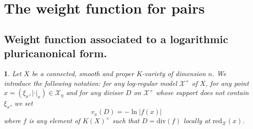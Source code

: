 \documentclass{amsart}%
\numberwithin{equation}{subsection}
\theoremstyle{plain2}
\theoremstyle{definition2}
\theoremstyle{stepstyle}
\theoremstyle{point}
\theoremstyle{subpoint}
\newtheorem{subpoint}[equation]{}%
\newcommand{\spa}[1]{\begin{subpoint}#1\end{subpoint}}           %
\newcommand{\cX}{\ensuremath{\mathscr{X}}}
\newcommand{\redu}{\mathrm{red}}
\newcommand{\divisor}{\mathrm{div}}
\begin{document}
\section{The weight function for pairs}
\subsection{Weight function associated to a logarithmic pluricanonical form.}
\spa{Let $X$ be a connected, smooth and proper $K$-variety of dimension $n$. We introduce the following notation: for any log-regular model $\cX^+$ of $X$, for any point $x = (\xi_x,|\cdot|_x) \in \widehat{\cX_{\eta}}$ and for any divisor $D$ on $\cX^+$ whose support does not contain $\xi_x$, we set $$v_x(D) = - \ln |f(x)|$$ where $f$ is any element of $K(X)^\times$ such that $D= \divisor(f)$ locally at $\redu_{\cX}(x)$.}
\end{document}
